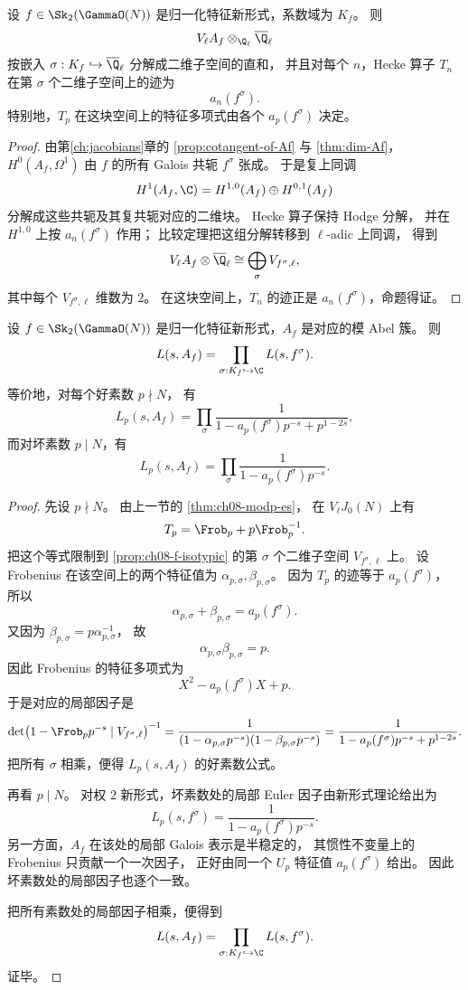 \begin{proposition}
\label{prop:ch08-f-isotypic}
设 $f\in \Sk_2(\GammaO(N))$ 是归一化特征新形式，系数域为 $K_f$。
则
\[
  V_\ell A_f\otimes_{\Q_\ell}\overline{\Q}_\ell
\]
按嵌入 $\sigma:K_f\hookrightarrow\overline{\Q}_\ell$ 分解成二维子空间的直和，
并且对每个 $n$，Hecke 算子 $T_n$ 在第 $\sigma$ 个二维子空间上的迹为
\[
  a_n(f^\sigma).
\]
特别地，$T_p$ 在这块空间上的特征多项式由各个 $a_p(f^\sigma)$ 决定。
\end{proposition}

\begin{proof}
由第\ref{ch:jacobians}章的 \cref{prop:cotangent-of-Af} 与 \cref{thm:dim-Af}，
$H^0(A_f,\Omega^1)$ 由 $f$ 的所有 Galois 共轭 $f^\sigma$ 张成。
于是复上同调
\[
  H^1(A_f,\C)=H^{1,0}(A_f)\oplus H^{0,1}(A_f)
\]
分解成这些共轭及其复共轭对应的二维块。
Hecke 算子保持 Hodge 分解，
并在 $H^{1,0}$ 上按 $a_n(f^\sigma)$ 作用；
比较定理把这组分解转移到 $\ell$-adic 上同调，
得到
\[
  V_\ell A_f\otimes\overline{\Q}_\ell
  \cong \bigoplus_{\sigma} V_{f^\sigma,\ell},
\]
其中每个 $V_{f^\sigma,\ell}$ 维数为 $2$。
在这块空间上，$T_n$ 的迹正是 $a_n(f^\sigma)$，命题得证。
\end{proof}

\begin{theorem}
\label{thm:ch08-eichler-shimura}
设 $f\in \Sk_2(\GammaO(N))$ 是归一化特征新形式，$A_f$ 是对应的模 Abel 簇。
则
\[
  L(s,A_f)=\prod_{\sigma:K_f\hookrightarrow\C}L(s,f^\sigma).
\]
等价地，对每个好素数 $p\nmid N$，
有
\[
  L_p(s,A_f)=\prod_{\sigma}
  \frac{1}{1-a_p(f^\sigma)p^{-s}+p^{1-2s}},
\]
而对坏素数 $p\mid N$，有
\[
  L_p(s,A_f)=\prod_{\sigma}\frac{1}{1-a_p(f^\sigma)p^{-s}}.
\]
\end{theorem}

\begin{proof}
先设 $p\nmid N$。
由上一节的 \cref{thm:ch08-modp-es}，
在 $V_\ell J_0(N)$ 上有
\[
  T_p=\Frob_p+p\Frob_p^{-1}.
\]
把这个等式限制到 \cref{prop:ch08-f-isotypic} 的第 $\sigma$ 个二维子空间 $V_{f^\sigma,\ell}$ 上。
设 Frobenius 在该空间上的两个特征值为 $\alpha_{p,\sigma},\beta_{p,\sigma}$。
因为 $T_p$ 的迹等于 $a_p(f^\sigma)$，
所以
\[
  \alpha_{p,\sigma}+\beta_{p,\sigma}=a_p(f^\sigma).
\]
又因为 $\beta_{p,\sigma}=p\alpha_{p,\sigma}^{-1}$，
故
\[
  \alpha_{p,\sigma}\beta_{p,\sigma}=p.
\]
因此 Frobenius 的特征多项式为
\[
  X^2-a_p(f^\sigma)X+p.
\]
于是对应的局部因子是
\[
  \det\bigl(1-\Frob_p p^{-s}\mid V_{f^\sigma,\ell}\bigr)^{-1}
  =\frac{1}{(1-\alpha_{p,\sigma}p^{-s})(1-\beta_{p,\sigma}p^{-s})}
  =\frac{1}{1-a_p(f^\sigma)p^{-s}+p^{1-2s}}.
\]
把所有 $\sigma$ 相乘，便得 $L_p(s,A_f)$ 的好素数公式。

再看 $p\mid N$。
对权 $2$ 新形式，坏素数处的局部 Euler 因子由新形式理论给出为
\[
  L_p(s,f^\sigma)=\frac{1}{1-a_p(f^\sigma)p^{-s}}.
\]
另一方面，$A_f$ 在该处的局部 Galois 表示是半稳定的，
其惯性不变量上的 Frobenius 只贡献一个一次因子，
正好由同一个 $U_p$ 特征值 $a_p(f^\sigma)$ 给出。
因此坏素数处的局部因子也逐个一致。

把所有素数处的局部因子相乘，便得到
\[
  L(s,A_f)=\prod_{\sigma:K_f\hookrightarrow\C}L(s,f^\sigma).
\]
证毕。
\end{proof}

